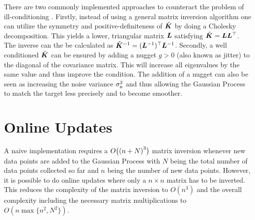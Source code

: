 There are two commonly implemented approaches to counteract the problem of 
ill-conditioning \parencite[cp.]{Sacks:1989cv, Neal:1997tj, Booker:1999wz, 
    Gramacy:2008es}. Firstly, instead of using a general matrix inversion 
algorithm one can utilize the symmetry and positive-definiteness of 
$\tilde{\bm{K}}$ by doing a Cholesky decomposition. This yields a lower, 
triangular matrix $\bm{L}$ satisfying $\tilde{\bm{K}} = \bm{L}\bm{L}^{\top}$. The 
inverse can the be calculated as $\tilde{\bm{K}}^{-1} = (\bm{L}^{-1})^{\top} \bm{L}^{-1}$.  Secondly, a well conditioned $\tilde{\bm{K}}$ can be ensured by adding 
a nugget $g > 0$ (also known as jitter) to the diagonal of the covariance 
matrix. This will increase all eigenvalues by the same value and thus improve 
the condition.  The addition of a nugget can also be seen as increasing the 
noise variance $\sigma_{\mathrm{n}}^2$ and thus allowing the Gaussian Process to match 
the target less precisely and to become smoother.

\section{Online Updates}\label{sec:onlineup}
A naive implementation requires a $O\!\del[1]{\del[0]{n + N}^3}$ matrix 
inversion whenever new data points are added to the Gaussian Process with $N$ 
being the total number of data points collected so far and $n$ being the number 
of new data points.  However, it is possible to do online updates where only 
a $n \times n$ matrix has to be inverted.  This reduces the complexity of the 
matrix inversion to $O(n^3)$ and the overall complexity including the necessary 
matrix multiplications to $O(n \max\{n^2, N^2\})$.

